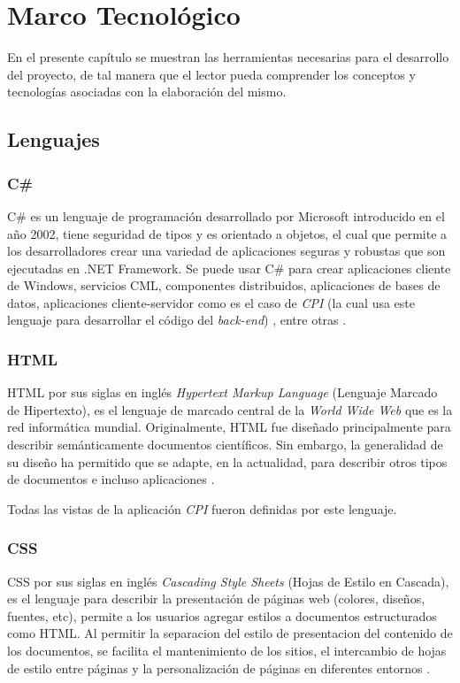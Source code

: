 \chapter{Marco Tecnológico}
En el presente capítulo se muestran las herramientas necesarias para el desarrollo del proyecto, de tal manera que el lector pueda comprender los conceptos y tecnologías asociadas con la elaboración del mismo. 

\section{Lenguajes}
\subsection{C\#}
C\# es un lenguaje de programación desarrollado por Microsoft introducido en el año 2002, tiene seguridad de tipos y es orientado a objetos, el cual que permite a los desarrolladores crear una variedad de aplicaciones seguras y robustas que son ejecutadas en .NET Framework. Se puede usar C\# para crear aplicaciones cliente de Windows, servicios CML, componentes distribuidos, aplicaciones de bases de datos, aplicaciones cliente-servidor como es el caso de \textit{CPI} (la cual usa este lenguaje para desarrollar el código del \textit{back-end}) , entre otras \cite{cSharpMicrosoft}.

\subsection{HTML}
HTML por sus siglas en inglés \textit{Hypertext Markup Language} (Lenguaje Marcado de Hipertexto), es el lenguaje de marcado central de la \textit{World Wide Web} que es la red informática mundial. Originalmente, HTML fue diseñado principalmente para describir semánticamente documentos científicos. Sin embargo, la generalidad de su diseño ha permitido que se adapte, en la actualidad, para describir otros tipos de documentos e incluso aplicaciones \cite{htmlW3C}.

Todas las vistas de la aplicación \textit{CPI} fueron definidas por este lenguaje.


\subsection{CSS}
CSS por sus siglas en inglés \textit{Cascading Style Sheets} (Hojas de Estilo en Cascada), es el lenguaje para describir la presentación de páginas web (colores, diseños, fuentes, etc), permite a los usuarios agregar estilos a documentos estructurados como HTML. Al permitir la separacion del estilo de presentacion del contenido de los documentos, se facilita el mantenimiento de los sitios, el intercambio de hojas de estilo entre páginas y la personalización  de páginas en diferentes entornos \cite{cssW3C}.


